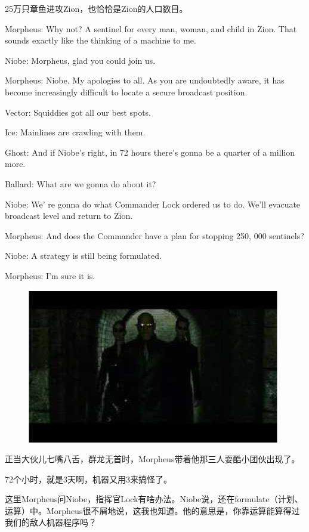 \documentclass{ctexart}
\newenvironment{myquote}{\color{green} \setlength{\leftskip}{6em} \setlength{\rightskip}{4em} \setlength{\parindent}{-2em}}{\par}
\begin{document}
25万只章鱼进攻Zion，也恰恰是Zion的人口数目。

\begin{myquote}
Morpheus: Why not? A sentinel for every man, woman, and child in Zion. That sounds exactly like the thinking of a machine to me.

Niobe: Morpheus, glad you could join us.

Morpheus: Niobe. My apologies to all. As you are undoubtedly aware, it has become increasingly difficult to locate a secure broadcast position.

Vector: Squiddies got all our best spots.

Ice: Mainlines are crawling with them.

Ghost: And if Niobe's right, in 72 hours there's gonna be a quarter of a million more.

Ballard: What are we gonna do about it?

Niobe: We' re gonna do what Commander Lock ordered us to do. We'll evacuate broadcast level and return to Zion.

Morpheus: And does the Commander have a plan for stopping 250, 000 sentinels?

Niobe: A strategy is still being formulated.

Morpheus: I'm sure it is.
\end{myquote}

\begin{figure}[htb]
\centering
\includegraphics[width=0.5\linewidth]{fig/read_reloaded-16}
\end{figure}

正当大伙儿七嘴八舌，群龙无首时，Morpheus带着他那三人耍酷小团伙出现了。

72个小时，就是3天啊，机器又用3来搞怪了。

这里Morpheus问Niobe，指挥官Lock有啥办法。Niobe说，还在formulate（计划、运算）中。Morpheus很不屑地说，这我也知道。他的意思是，你靠运算能算得过我们的敌人机器程序吗？
\end{document}
